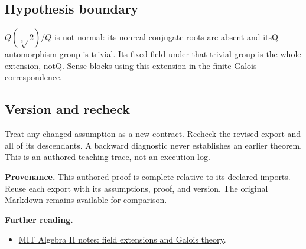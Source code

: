 \documentclass[preprint,12pt,aps,pra,showkeys,amsmath,amssymb,superscriptaddress,floatfix]{revtex4-2}
\theoremstyle{definition}
\theoremstyle{remark}
\providecommand{\tightlist}{\setlength{\itemsep}{2pt}\setlength{\parskip}{0pt}}
\begin{document}
\subsection{Hypothesis boundary}
\(Q(\sqrt[3]{}2)/Q\) is not normal: its nonreal conjugate roots are
absent and itsQ-automorphism group is trivial. Its fixed field under
that trivial group is the whole extension, notQ. Sense blocks using this
extension in the finite Galois correspondence.

\subsection{Version and recheck}
Treat any changed assumption as a new contract. Recheck the revised
export and all of its descendants. A backward diagnostic never
establishes an earlier theorem. This is an authored teaching trace, not
an execution log.

\par\medskip\begingroup\small\linespread{1.0}\selectfont\noindent\textbf{Provenance.} This authored proof is complete relative to its declared imports. Reuse
each export with its assumptions, proof, and version. The original
Markdown remains available for comparison.
\par\endgroup

\par\smallskip\begingroup\small\linespread{1.0}\selectfont\noindent\textbf{Further reading.} \begin{itemize}
\tightlist
\item
  \href{https://ocw.mit.edu/courses/res-18-012-algebra-ii-student-notes-spring-2022/pages/student-notes/}{MIT
  Algebra II notes: field extensions and Galois theory}.
\end{itemize}\par\endgroup
\end{document}
